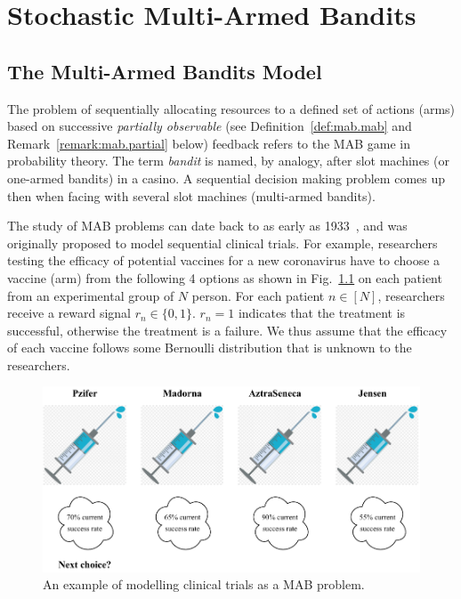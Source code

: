 \chapter{Stochastic Multi-Armed Bandits}\label{chap:mab}
	\minitoc
	\newpage


\section{The Multi-Armed Bandits Model}\label{sec:mab.model}

The problem of sequentially allocating resources to a defined set of actions (arms) based on successive \emph{partially observable} (see Definition~\ref{def:mab.mab} and Remark~\ref{remark:mab.partial} below) feedback refers to the MAB game in probability theory. The term \emph{bandit} is named, by analogy, after slot machines (or one-armed bandits) in a casino. A sequential decision making problem comes up then when facing with several slot machines (multi-armed bandits).

The study of MAB problems can date back to as early as 1933~\citep{thompson1933}, and was originally proposed to model sequential clinical trials. For example, researchers testing the efficacy of potential vaccines for a new coronavirus have to choose a vaccine (arm) from the following 4 options as shown in Fig.~\ref{fig:mab.covid} on each patient from an experimental group of $N$ person. For each patient $n\in[N]$, researchers receive a reward signal $r_n\in\{0,1\}$. $r_n=1$ indicates that the treatment is successful, otherwise the treatment is a failure. We thus assume that the efficacy of each vaccine follows some Bernoulli distribution that is unknown to the researchers.

\begin{figure}[ht]
    \centering
    \includegraphics[width=\textwidth]{Chapter2/img/covid.pdf}
    \caption{An example of modelling clinical trials as a MAB problem.}
    \label{fig:mab.covid}
\end{figure}

